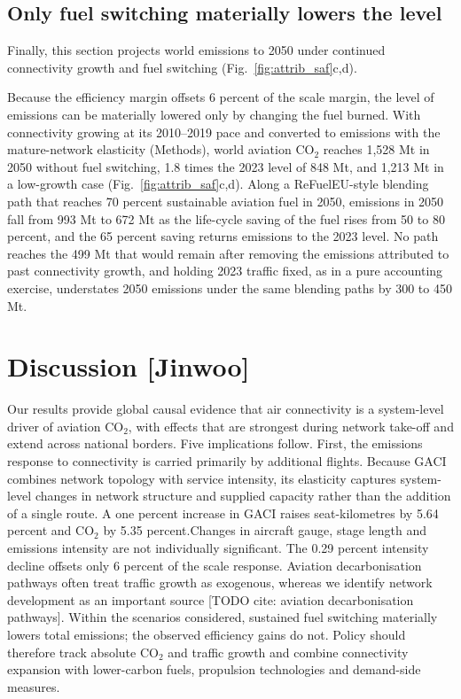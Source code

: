 \documentclass[12pt]{extarticle}
\begin{document}
\subsection*{Only fuel switching materially lowers the level}
Finally, this section projects world emissions to 2050 under continued
connectivity growth and fuel switching (Fig.~\ref{fig:attrib_saf}c,d).

Because the efficiency margin offsets 6 percent of the scale margin, the
level of emissions can be materially lowered only by changing the fuel
burned. With connectivity growing at its 2010--2019 pace and converted to
emissions with the mature-network elasticity (Methods), world aviation
CO$_2$ reaches 1{,}528 Mt in 2050 without fuel switching, 1.8 times the
2023 level of 848 Mt, and 1{,}213 Mt in a low-growth case
(Fig.~\ref{fig:attrib_saf}c,d). Along a ReFuelEU-style blending path that reaches
70 percent sustainable aviation fuel in 2050, emissions in 2050 fall from
993 Mt to 672 Mt as the life-cycle saving of the fuel rises from 50 to 80
percent, and the 65 percent saving returns emissions to the 2023 level.
No path reaches the 499 Mt that would remain after removing the emissions
attributed to past connectivity growth, and holding 2023 traffic fixed,
as in a pure accounting exercise, understates 2050 emissions under the
same blending paths by 300 to 450 Mt.

\section*{Discussion [Jinwoo]}
Our results provide global causal evidence that air connectivity is a system-level driver of aviation CO$_2$, with effects that are strongest during network take-off and extend across national borders. Five implications follow. First, the emissions response to connectivity is carried primarily by additional flights. Because GACI combines network topology with service intensity, its elasticity captures system-level changes in network structure and supplied capacity rather than the addition of a single route.  A one percent increase in GACI raises seat-kilometres by 5.64 percent and CO$_2$ by 5.35 percent.Changes in aircraft gauge, stage length and emissions intensity are not individually significant.  The 0.29 percent intensity decline offsets only 6 percent of the scale response. Aviation decarbonisation pathways often treat traffic growth as exogenous, whereas we identify network development as an important source [TODO cite: aviation decarbonisation pathways]. Within the scenarios considered, sustained fuel switching materially lowers total emissions; the observed efficiency gains do not. Policy should therefore track absolute CO$_2$ and traffic growth and combine connectivity expansion with lower-carbon fuels, propulsion technologies and demand-side measures.
\end{document}
